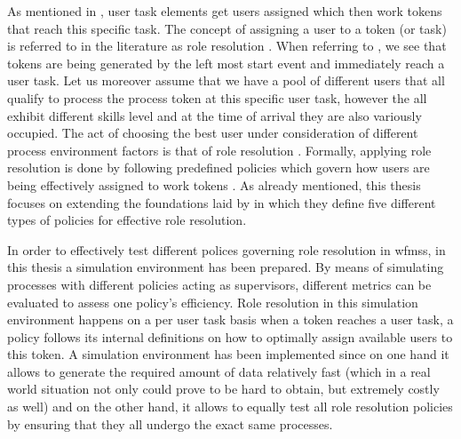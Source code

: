 As mentioned in , user task elements get users assigned which then work tokens that reach this specific task. The concept of assigning a user to a token (or task) is referred to in the literature as role resolution \citep{Zeng2005,Cheng2000}. When referring to , we see that tokens are being generated by the left most start event and immediately reach a user task. Let us moreover assume that we have a pool of different users that all qualify to process the process token at this specific user task, however the all exhibit different skills level and at the time of arrival they are also variously occupied. The act of choosing the best user under consideration of different process environment factors is that of role resolution \citep{Zeng2005}. Formally, applying role resolution is done by following predefined policies which govern how users are being effectively assigned to work tokens \citep{Zeng2005}. As already mentioned, this thesis focuses on extending the foundations laid by \citet{Zeng2005} in which they define five different types of policies for effective role resolution.

In order to effectively test different polices governing role resolution in \glspl{wfms}, in this thesis a simulation environment has been prepared. By means of simulating processes with different policies acting as supervisors, different metrics can be evaluated to assess one policy's efficiency. Role resolution in this simulation environment happens on a per user task basis \ie when a token reaches a user task, a policy follows its internal definitions on how to optimally assign available users to this token. A simulation environment has been implemented since on one hand it allows to generate the required amount of data relatively fast (which in a real world situation not only could prove to be hard to obtain, but extremely costly as well) and on the other hand, it allows to equally test all role resolution policies by ensuring that they all undergo the exact same processes.